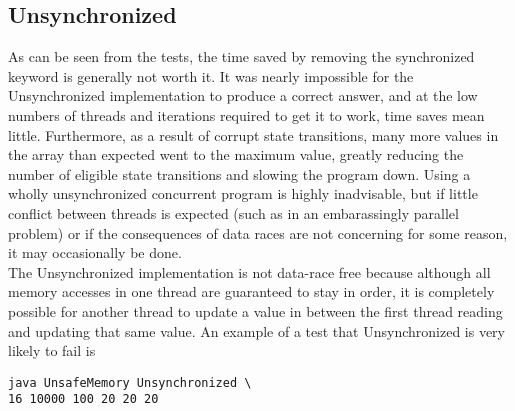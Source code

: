 \documentclass[letterpaper,twocolumn,10pt]{article}
\begin{document}
\subsection{Unsynchronized}
As can be seen from the tests, the time saved by removing the synchronized keyword is generally not worth it. It was nearly impossible for the Unsynchronized implementation to produce a correct answer, and at the low numbers of threads and iterations required to get it to work, time saves mean little. Furthermore, as a result of corrupt state transitions, many more values in the array than expected went to the maximum value, greatly reducing the number of eligible state transitions and slowing the program down. Using a wholly unsynchronized concurrent program is highly inadvisable, but if little conflict between threads is expected (such as in an embarassingly parallel problem) or if the consequences of data races are not concerning for some reason, it may occasionally be done. \\
The Unsynchronized implementation is not data-race free because although all memory accesses in one thread are guaranteed to stay in order, it is completely possible for another thread to update a value in between the first thread reading and updating that same value. An example of a test that Unsynchronized is very likely to fail is
\begin{verbatim}
java UnsafeMemory Unsynchronized \
16 10000 100 20 20 20\end{verbatim}
\end{document}
